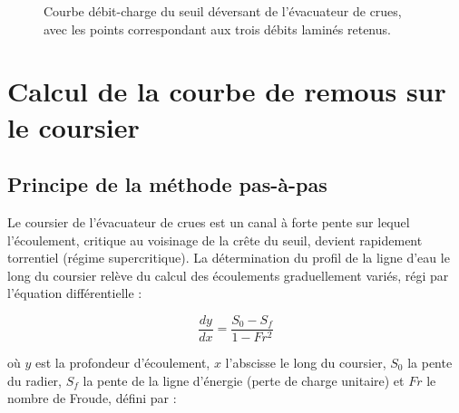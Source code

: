 \begin{figure}[H]
    \centering
    \caption{Courbe débit-charge du seuil déversant de l'évacuateur de crues, avec les points correspondant aux trois débits laminés retenus.}
    \label{fig:courbe_debit_charge}
\end{figure}

\section{Calcul de la courbe de remous sur le coursier}
\label{sec:courbe_remous}

\subsection{Principe de la méthode pas-à-pas}
\label{subsec:principe_methode_pas_a_pas}

Le coursier de l'évacuateur de crues est un canal à forte pente sur lequel l'écoulement, critique au voisinage de la crête du seuil, devient rapidement torrentiel (régime supercritique). La détermination du profil de la ligne d'eau le long du coursier relève du calcul des écoulements graduellement variés, régi par l'équation différentielle \cite{chow1959open} :

\begin{equation}
\frac{dy}{dx} = \frac{S_0 - S_f}{1 - Fr^2}
\label{eq:gvf}
\end{equation}

où $y$ est la profondeur d'écoulement, $x$ l'abscisse le long du coursier, $S_0$ la pente du radier, $S_f$ la pente de la ligne d'énergie (perte de charge unitaire) et $Fr$ le nombre de Froude, défini par :

